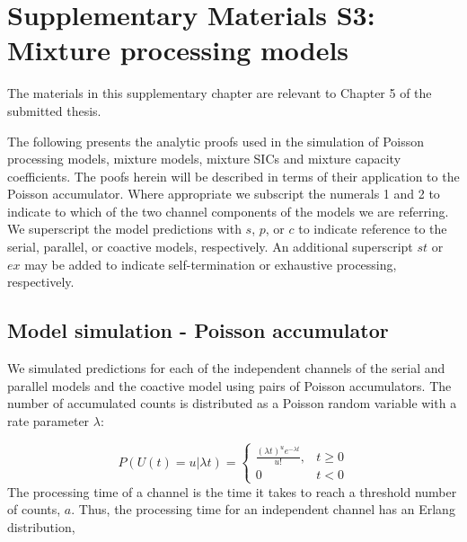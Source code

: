 \chapter{Supplementary Materials S3: \\ Mixture processing models}
\label{Appendix:C_MixtureModels}

\setcounter{equation}{0}
\setcounter{figure}{0}
\setcounter{table}{0}
\setcounter{section}{0}
\renewcommand\thefigure{S3\thesection.\arabic{figure}}
\renewcommand\thetable{S3\thesection.\arabic{table}}

\noindent The materials in this supplementary chapter are relevant to Chapter 5 of the submitted thesis.

\newpage

The following presents the analytic proofs used in the simulation of Poisson processing models, mixture models, mixture SICs and mixture capacity coefficients. The poofs herein will be described in terms of their application to the Poisson accumulator. Where appropriate we subscript the numerals 1 and 2 to indicate to which of the two channel components of the models we are referring. We superscript the model predictions with $s$, $p$, or $c$ to indicate reference to the serial, parallel, or coactive models, respectively. An additional superscript $st$ or $ex$ may be added to indicate self-termination or exhaustive processing, respectively. 

\section{Model simulation - Poisson accumulator}
We simulated predictions for each of the independent channels of the serial and parallel models and the coactive model using pairs of Poisson accumulators. The number of accumulated counts is distributed as a Poisson random variable with a rate parameter $\lambda$:


\begin{equation} \tag{1}
P(U(t) = u | \lambda t) = 
\left\{ \begin{array}{lr} 
  \frac{(\lambda t)^u e^{-\lambda t}}{u!}, & t \ge 0  \\
  0 & t < 0
\end{array}
\right.
\label{eq:poisspdf}
\end{equation}
The processing time of a channel is the time it takes to reach  a threshold number of counts, $a$. Thus, the processing time for an independent channel has an Erlang distribution, 

